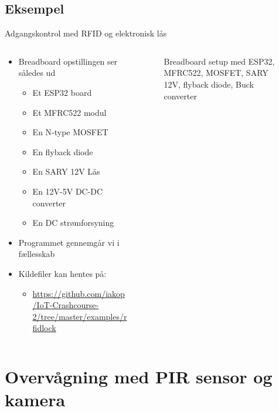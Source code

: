 \documentclass[aspectratio=169]{beamer}
\begin{document}
\subsection{Eksempel}
\begin{frame}{Adgangskontrol med RFID og elektronisk lås}
\begin{columns}
	\begin{column}{0.5\textwidth}
		\begin{textBox}
		\begin{itemize}
			\item Breadboard opstillingen ser således ud
			\begin{itemize}
				\item Et ESP32 board
				\item Et MFRC522 modul
				\item En N-type MOSFET
				\item En flyback diode
				\item En SARY 12V Lås
				\item En 12V-5V DC-DC converter
				\item En DC strømforsyning
			\end{itemize}
			\item Programmet gennemgår vi i fællesskab
			\item Kildefiler kan hentes på:
			\begin{itemize}
				\item \tiny\url{https://github.com/iakop/IoT-Crashcourse-2/tree/master/examples/rfidlock}
			\end{itemize}
		\end{itemize}
		\end{textBox}
	\end{column}
	\begin{column}{0.5\textwidth}
		\centering
		\begin{figure}
  			
  			\caption{Breadboard setup med ESP32, MFRC522, MOSFET, SARY 12V, flyback diode, Buck converter}
  			\label{fig:rfidlock}
		\end{figure}
	\end{column}
\end{columns}
\end{frame}

\section{Overvågning med PIR sensor og kamera}
\begin{frame}
\end{frame}
\end{document}
